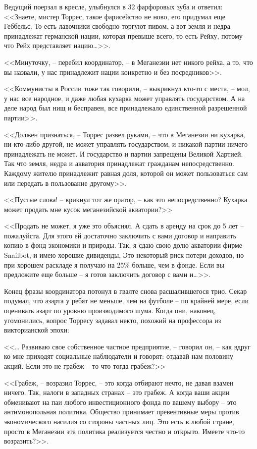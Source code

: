 Ведущий поерзал в кресле, улыбнулся в 32 фарфоровых зуба и ответил: <<Знаете, мистер Торрес, такое фарисейство не ново, его придумал еще Геббельс. То есть лавочники свободно торгуют пивом, а вот земля и недра принадлежат германской нации, которая превыше всего, то есть Рейху, потому что Рейх представляет нацию\ldots{}>>.

<<Минуточку, -- перебил координатор, -- в Меганезии нет никого рейха, а то, что вы назвали, у нас принадлежит нации конкретно и без посредников>>.

<<Коммунисты в России тоже так говорили, -- выкрикнул кто-то с места, -- мол, у нас все народное, и даже любая кухарка может управлять государством. А на деле народ был нищ и бесправен, все принадлежало единственной разрешенной партии>>.

<<Должен признаться, -- Торрес развел руками, -- что в Меганезии ни кухарка, ни кто-либо другой, не может управлять государством, и никакой партии ничего принадлежать не может. И государство и партии запрещены Великой Хартией. Так что земля, недра и акватория принадлежат гражданам непосредственно. Каждому жителю принадлежит равная доля, которой он может пользоваться сам или передать в пользование другому>>.

<<Пустые слова! -- крикнул тот же оратор, -- как это непосредственно? Кухарка может продать мне кусок меганезийской акватории?>>

<<Продать не может, я уже это объяснял. А сдать в аренду на срок до 5 лет -- пожалуйста. Для этого ей достаточно заключить с вами договор и направить копию в фонд экономики и природы. Так, я сдаю свою долю акватории фирме Snailbot, и имею хорошие дивиденды, Это некоторый риск потери доходов, но при хорошем раскладе я получаю на 25\% больше, чем в фонде. Если вы предложите еще больше -- я готов заключить договор с вами и\ldots{}>>.

Конец фразы координатора потонул в гвалте снова расшалившегося трио. Секар подумал, что азарта у ребят не меньше, чем на футболе -- по крайней мере, если оценивать азарт по уровню производимого шума. Когда они, наконец, угомонились, вопрос Торресу задавал некто, похожий на профессора из викторианской эпохи:

<<\ldots{} Развиваю свое собственное частное предприятие, -- говорил он, -- как вдруг ко мне приходят социальные наблюдатели и говорят: отдавай нам половину акций. Если это не грабеж -- то что тогда грабеж?>>

<<Грабеж, -- возразил Торрес, -- это когда отбирают нечто, не давая взамен ничего. Так, налоги в западных странах -- это грабеж. А когда ваши акции обменивают на паи любого инвестиционного фонда по вашему выбору -- это антимонопольная политика. Общество принимает превентивные меры против экономического насилия со стороны частных лиц. Это есть в любой стране, просто в Меганезии эта политика реализуется честно и открыто. Имеете что-то возразить?>>.

